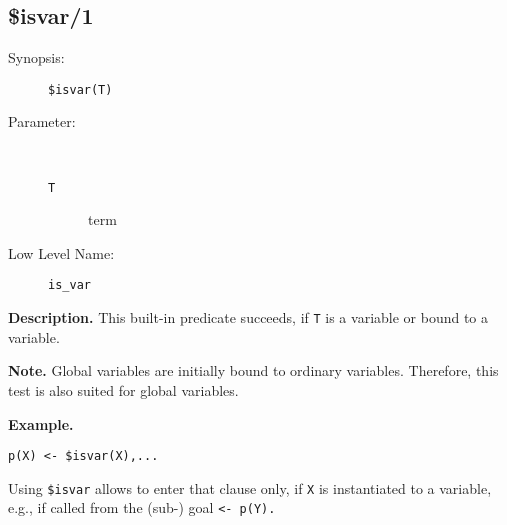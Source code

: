 %
%
%
\subsection{\$isvar/1}

\begin{description}
\item[Synopsis:]
	{\tt \$isvar(T)}
\item[Parameter:]\ \\[-0.5cm]
	\begin{description}
	\item[{\tt T}]
	term
	\end{description}
\item[Low Level Name:]
	{\tt is\_var }
\end{description}

\vspace*{0.5cm}
\noindent
{\bf Description.}
This built-in predicate succeeds, if {\tt T} is
a variable or bound to a variable.

\vspace*{0.5cm}
\noindent
{\bf Note.}
Global variables are initially bound to ordinary variables.
Therefore, this test is also suited for global variables.

\vspace*{0.5cm}
\noindent
{\bf Example.}
\begin{verbatim}
p(X) <- $isvar(X),...
\end{verbatim}
Using {\tt \$isvar} allows to enter that clause only, if {\tt X} is
instantiated to a variable, e.g., if called from the (sub-) goal
{\tt <- p(Y).}


